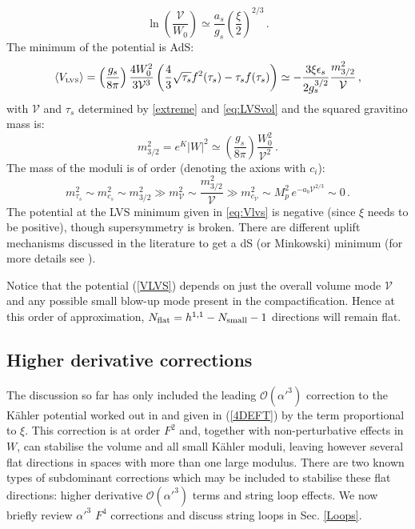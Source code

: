 \documentclass[11pt,a4paper]{article}
\newcommand{\be}{\begin{equation}}
\newcommand{\ee}{\end{equation}}
\def\LVS{{\scriptscriptstyle \rm LVS}}
\newcommand\vo{{\mathcal{V}}}
\newcommand{\mc}{\mathcal}
\begin{document}
\be
\ln\left(\frac{\vo}{W_0}\right)\simeq\frac{a_s}{g_s}\left(\frac{\xi}{2}\right)^{2/3}\,.
\label{eq:LVSvol}
\ee
The minimum of the potential is AdS:
\be
\langle V_\LVS\rangle=\left(\frac{g_s}{8\pi}\right) \frac{4 W_0^2}{3\vo^3}\left(\frac43\sqrt{\tau_s}f^2(\tau_s)- \tau_s f(\tau_s)\right)\simeq
-\frac{3\xi\epsilon_s}{2 g_s^{3/2}}\frac{m_{3/2}^2}{\vo}\,,
\label{eq:Vlvs}
\ee
with $\vo$ and $\tau_s$ determined by \eqref{extreme} and \eqref{eq:LVSvol} and the squared gravitino mass is:
\be
m_{3/2}^2=e^K |W|^2 \simeq \left(\frac{g_s}{8\pi}\right) \frac{W_0^2}{\vo^2}\,.
\ee
The mass of the moduli is of order (denoting the axions with $c_i$):
\be
m_{\tau_s}^2 \sim m_{c_s}^2 \sim  m_{3/2}^2  \gg m_{\vo}^2 \sim \frac{m_{3/2}^2}{\vo} \gg m_{c_\vo}^2\sim M_p^2\,e^{- a_b \vo^{2/3}}\sim 0\,.
\ee
The potential at the LVS minimum given in \eqref{eq:Vlvs} is negative (since $\xi$ needs to be positive), though supersymmetry is broken. There are different uplift mechanisms discussed in the literature to get a dS (or Minkowski) minimum (for more details see \cite{Kachru:2003aw, deAlwis:2016cty,CYembedding, Cicoli:2012fh,Cicoli:2015ylx}).

Notice that the potential (\ref{VLVS}) depends on just the overall volume mode $\vo$ and any possible small blow-up mode present in the compactification. Hence at this order of approximation, $N_{\rm flat} = h^{1,1} - N_{\rm small} -1$ directions will remain flat. 

\subsection{Higher derivative corrections}

The discussion so far has only included the leading $\mc{O}(\alpha'^3)$ correction to the K\"ahler potential worked out in \cite{Becker:2002nn} and given in (\ref{4DEFT}) by the term proportional to $\xi$. This correction is at order $F^2$ and, together with non-perturbative effects in $W$, can stabilise the volume and all small K\"ahler moduli, leaving however several flat directions in spaces with more than one large modulus. There are two known types of subdominant corrections which may be included to stabilise these flat directions: higher derivative $\mc{O}(\alpha'^3)$ terms and string loop effects. We now briefly review $\alpha'^3$ $F^4$ corrections and discuss string loops in Sec. \ref{Loops}. 
\end{document}
